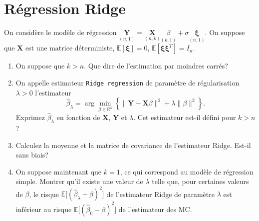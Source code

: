 \documentclass[a4paper,11pt,fleqn]{article}
\newcommand{\R}{\ensuremath{\mathbb{R}}}
\newcommand{\E}{\ensuremath{\mathbb{E}}}
\newcommand{\1}{\ensuremath{\mathbbm{1}}}
\newcommand{\bY}{\mathbf{Y}}
\newcommand{\X}{\mathbf{X}}
\newcommand{\bxi}{\mathbf{\xi}}
\begin{document}
\section{R\'egression Ridge}
On consid\`ere le mod\`ele de r\'egression \qquad
$\underset{(n,1)}{\bY}=\underset{(n,k)}{\X}\underset{(k,1)}{\beta}+ \sigma
\underset{(n,1)}{\bxi}$. \quad On suppose que $\X$ est une matrice
d\'eterministe, $\E[\bxi]=0$, $\E[\bxi\bxi^T]=I_n$.
\begin{enumerate}
\item On suppose que $k> n$. Que dire de l'estimation par moindres carr\'es?
\item On appelle estimateur \texttt{Ridge regression} de param\`etre de
  r\'egularisation $\lambda>0$ l'estimateur
  $$
  \hat \beta_{\lambda}= \arg \min_{\beta\in\R^k}\left\{ \|\bY-
    \X\beta\|^2+\lambda \|\beta\|^2\right\}.
  $$
  Exprimez $\hat \beta_{\lambda}$ en fonction de $\X$, $\bY$ et $\lambda$.
  Cet estimateur est-il d\'efini pour $k>n$?
\item Calculez la moyenne et la matrice de covariance de
l'estimateur Ridge. Est-il sans biais?
\item On suppose maintenant que $k=1$, ce qui correspond au mod\`ele de
  r\'egression simple.  Montrer qu'il existe une valeur de $\lambda$ telle que,
  pour certaines valeurs de $\beta$, le risque $\E\big[(\hat\beta_\lambda -
  \beta)^2\big]$ de l'estimateur Ridge de param\`etre $\lambda$ est inf\'erieur
  au risque $\E\big[(\hat\beta_0 - \beta)^2\big]$ de l'estimateur des MC.
\end{enumerate}
\end{document}
